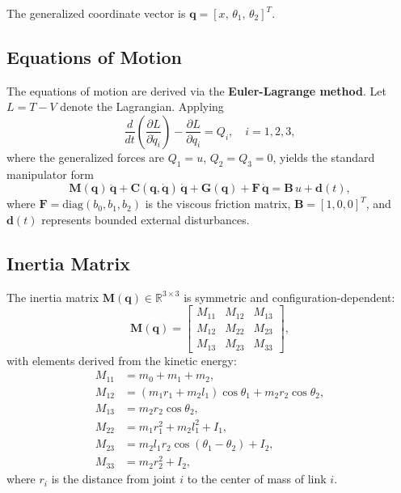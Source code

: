 \documentclass[11pt,a4paper]{article}
\begin{document}
The generalized coordinate vector is $\mathbf{q} = [x,\,\theta_1,\,\theta_2]^T$.

\subsection{Equations of Motion}

The equations of motion are derived via the \textbf{Euler-Lagrange method}.
Let $L = T - V$ denote the Lagrangian.  Applying
\begin{equation}
    \frac{d}{dt}\!\left(\frac{\partial L}{\partial \dot{q}_i}\right)
    - \frac{\partial L}{\partial q_i} = Q_i, \quad i = 1, 2, 3,
\end{equation}
where the generalized forces are $Q_1 = u$, $Q_2 = Q_3 = 0$, yields the
standard manipulator form
\begin{equation}
\label{eq:eom}
    \mathbf{M}(\mathbf{q})\,\ddot{\mathbf{q}}
    + \mathbf{C}(\mathbf{q},\dot{\mathbf{q}})\,\dot{\mathbf{q}}
    + \mathbf{G}(\mathbf{q})
    + \mathbf{F}\,\dot{\mathbf{q}}
    = \mathbf{B}\,u + \mathbf{d}(t),
\end{equation}
where $\mathbf{F} = \mathrm{diag}(b_0,b_1,b_2)$ is the viscous friction
matrix, $\mathbf{B} = [1,0,0]^T$, and $\mathbf{d}(t)$ represents bounded
external disturbances.

\subsection{Inertia Matrix}

The inertia matrix $\mathbf{M}(\mathbf{q}) \in \mathbb{R}^{3\times3}$ is
symmetric and configuration-dependent:
\begin{equation}
    \mathbf{M}(\mathbf{q}) =
    \begin{bmatrix}
        M_{11} & M_{12} & M_{13} \\
        M_{12} & M_{22} & M_{23} \\
        M_{13} & M_{23} & M_{33}
    \end{bmatrix},
\end{equation}
with elements derived from the kinetic energy:
\begin{align}
    M_{11} &= m_0 + m_1 + m_2, \\
    M_{12} &= (m_1 r_1 + m_2 l_1)\cos\theta_1 + m_2 r_2\cos\theta_2, \\
    M_{13} &= m_2 r_2\cos\theta_2, \\
    M_{22} &= m_1 r_1^2 + m_2 l_1^2 + I_1, \\
    M_{23} &= m_2 l_1 r_2\cos(\theta_1 - \theta_2) + I_2, \\
    M_{33} &= m_2 r_2^2 + I_2,
\end{align}
where $r_i$ is the distance from joint $i$ to the center of mass of link $i$.
\end{document}
